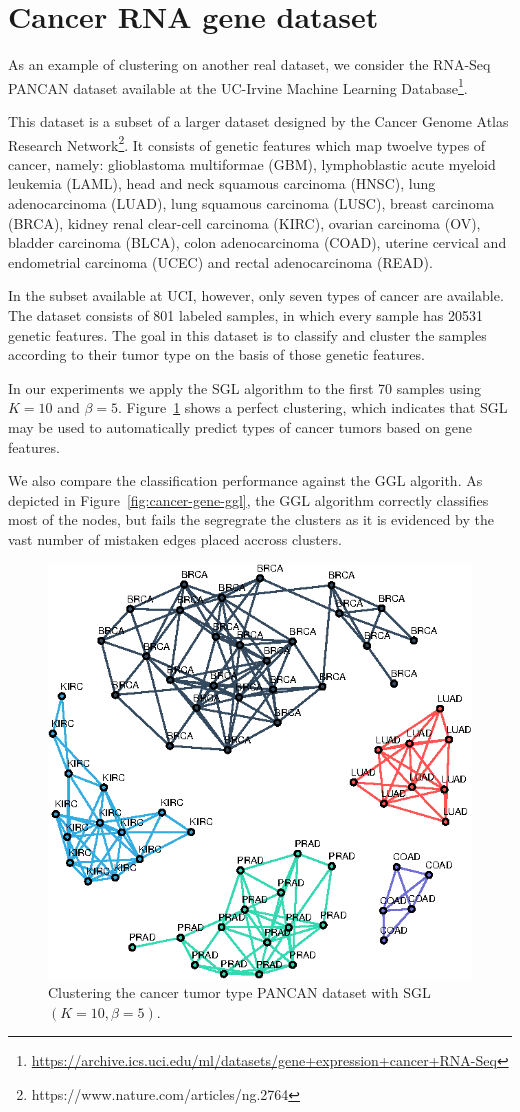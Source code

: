 \section{Cancer RNA gene dataset}

As an example of clustering on another real dataset, we consider the RNA-Seq
PANCAN dataset available at the UC-Irvine Machine Learning Database\footnote{\url{https://archive.ics.uci.edu/ml/datasets/gene+expression+cancer+RNA-Seq}}.

This dataset is a subset of a larger dataset designed by the Cancer Genome Atlas
Research Network\footnote{https://www.nature.com/articles/ng.2764}. It consists
of genetic features which map twoelve types of cancer, namely:
glioblastoma multiformae (GBM), lymphoblastic acute myeloid leukemia (LAML), head and neck squamous carcinoma (HNSC),
lung adenocarcinoma (LUAD), lung squamous carcinoma (LUSC), breast carcinoma (BRCA), kidney renal clear-cell carcinoma (KIRC),
ovarian carcinoma (OV), bladder carcinoma (BLCA), colon adenocarcinoma (COAD), uterine cervical and endometrial carcinoma (UCEC)
and rectal adenocarcinoma (READ).

In the subset available at UCI, however, only seven types of cancer are available.
The dataset consists of 801 labeled samples, in which every sample has 20531 genetic
features. The goal in this dataset is to classify and cluster the samples according to
their tumor type on the basis of those genetic features.

In our experiments we apply the \textsf{SGL} algorithm to the first 70 samples using
$K = 10$ and $\beta = 5$. Figure~\ref{fig:cancer-gene-sgl} shows a perfect clustering,
which indicates that \textsf{SGL} may be used to automatically predict types of cancer tumors
based on gene features.

We also compare the classification performance against the \textsf{GGL} algorith. As depicted in
Figure~\ref{fig:cancer-gene-ggl}, the \textsf{GGL} algorithm correctly classifies most of the
nodes, but fails the segregrate the clusters as it is evidenced by the vast number of mistaken
edges placed accross clusters.

\begin{figure}[!htb]
  \centering
  \includegraphics[width=.475\textwidth]{cancer-rna/latex/figures/cancer-rna-graph-subset.eps}
  \caption{Clustering the cancer tumor type \textsf{PANCAN} dataset with \textsf{SGL}$(K = 10, \beta = 5)$.}
  \label{fig:cancer-gene-sgl}
\end{figure}

